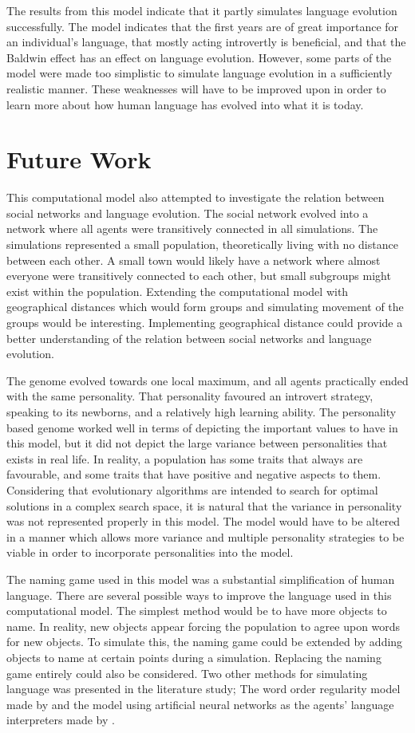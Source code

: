 The results from this model indicate that it partly simulates language evolution successfully. The model indicates that the first years are of great importance for an individual's language, that mostly acting introvertly is beneficial, and that the Baldwin effect has an effect on language evolution. However, some parts of the model were made too simplistic to simulate language evolution in a sufficiently realistic manner. These weaknesses will have to be improved upon in order to learn more about how human language has evolved into what it is today.
 
\section{Future Work}
This computational model also attempted to investigate the relation between social networks and language evolution. The social network evolved into a network where all agents were transitively connected in all simulations. The simulations represented a small population, theoretically living with no distance between each other. A small town would likely have a network where almost everyone were transitively connected to each other, but small subgroups might exist within the population. Extending the computational model with geographical distances which would form groups and simulating movement of the groups would be interesting. Implementing geographical distance could provide a better understanding of the relation between social networks and language evolution.
 
The genome evolved towards one local maximum, and all agents practically ended with the same personality. That personality favoured an introvert strategy, speaking to its newborns, and a relatively high learning ability. The personality based genome worked well in terms of depicting the important values to have in this model, but it did not depict the large variance between personalities that exists in real life.  In reality, a population has some traits that always are favourable, and some traits that have positive and negative aspects to them. Considering that evolutionary algorithms are intended to search for optimal solutions in a complex search space, it is natural that the variance in personality was not represented properly in this model. The model would have to be altered in a manner which allows more variance and multiple personality strategies to be viable in order to incorporate personalities into the model.  
 
The naming game used in this model was a substantial simplification of human language. There are several possible ways to improve the language used in this computational model. The simplest method would be to have more objects to name. In reality, new objects appear forcing the population to agree upon words for new objects. To simulate this, the naming game could be extended by adding objects to name at certain points during a simulation. Replacing the naming game entirely could also be considered. Two other methods for simulating language was presented in the literature study; The word order regularity model made by \citet{gong2004computational} and the model using artificial neural networks as the agents’ language interpreters made by \citet{munroe2002learning}.

